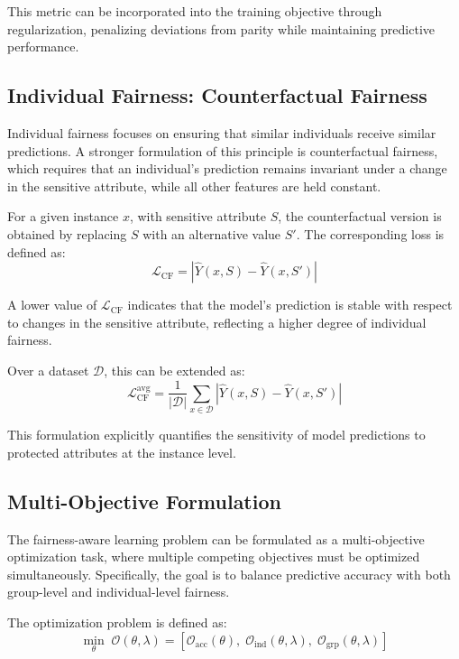 \documentclass[12pt,a4paper]{article}
\begin{document}
This metric can be incorporated into the training objective through regularization, penalizing deviations from parity while maintaining predictive performance.

\subsection{Individual Fairness: Counterfactual Fairness}

Individual fairness focuses on ensuring that similar individuals receive similar predictions. A stronger formulation of this principle is counterfactual fairness, which requires that an individual's prediction remains invariant under a change in the sensitive attribute, while all other features are held constant.

For a given instance $x$, with sensitive attribute $S$, the counterfactual version is obtained by replacing $S$ with an alternative value $S'$. The corresponding loss is defined as:
\begin{equation}
    \mathcal{L}_{\text{CF}} = \left| \hat{Y}(x, S) - \hat{Y}(x, S') \right|
\end{equation}

A lower value of $\mathcal{L}_{\text{CF}}$ indicates that the model's prediction is stable with respect to changes in the sensitive attribute, reflecting a higher degree of individual fairness.

Over a dataset $\mathcal{D}$, this can be extended as:
\begin{equation}
    \mathcal{L}_{\text{CF}}^{\text{avg}} =
    \frac{1}{|\mathcal{D}|} \sum_{x \in \mathcal{D}}
    \left| \hat{Y}(x, S) - \hat{Y}(x, S') \right|
\end{equation}

This formulation explicitly quantifies the sensitivity of model predictions to protected attributes at the instance level.

\subsection{Multi-Objective Formulation}

The fairness-aware learning problem can be formulated as a multi-objective optimization task, where multiple competing objectives must be optimized simultaneously. Specifically, the goal is to balance predictive accuracy with both group-level and individual-level fairness.

The optimization problem is defined as:
\begin{equation}
    \min_{\theta} \; \mathcal{O}(\theta, \lambda) =
    \left[
        \mathcal{O}_{\text{acc}}(\theta), \;
        \mathcal{O}_{\text{ind}}(\theta, \lambda), \;
        \mathcal{O}_{\text{grp}}(\theta, \lambda)
    \right]
\end{equation}
\end{document}
